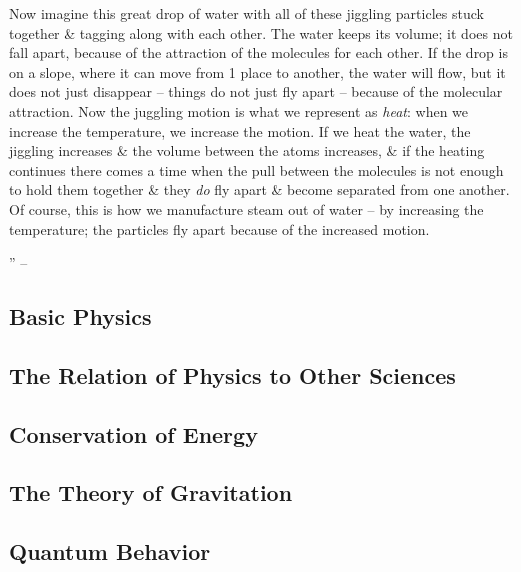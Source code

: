\documentclass{article}
\begin{document}
Now imagine this great drop of water with all of these jiggling particles stuck together \& tagging along with each other. The water keeps its volume; it does not fall apart, because of the attraction of the molecules for each other. If the drop is on a slope, where it can move from 1 place to another, the water will flow, but it does not just disappear -- things do not just fly apart -- because of the molecular attraction. Now the juggling motion is what we represent as {\it heat}: when we increase the temperature, we increase the motion. If we heat the water, the jiggling increases \& the volume between the atoms increases, \& if the heating continues there comes a time when the pull between the molecules is not enough to hold them together \& they {\it do} fly apart \& become separated from one another. Of course, this is how we manufacture steam out of water -- by increasing the temperature; the particles fly apart because of the increased motion.

'' -- \cite[pp. 4--4]{Feyman_Leighton_Sands_6_easy_pieces}

\subsection{Basic Physics}

\subsection{The Relation of Physics to Other Sciences}

\subsection{Conservation of Energy}

\subsection{The Theory of Gravitation}

\subsection{Quantum Behavior}

\end{document}
